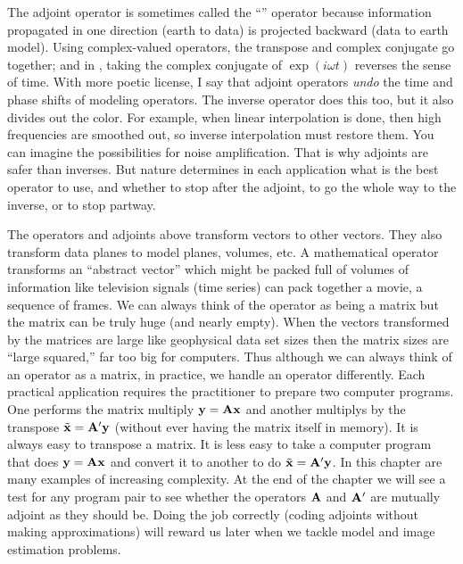 \par
The adjoint operator is sometimes called
the ``'' operator
because information propagated in one direction (earth to data) is projected
backward (data to earth model).
Using complex-valued operators,
the transpose and complex conjugate go together;
and in , taking the complex conjugate
of $\exp(i\omega t)$ reverses the sense of time.
With more poetic license, I say that adjoint operators
{\em  undo}
the time and phase shifts of modeling operators.
The inverse operator does this too,
but it also divides out the color.
For example, when linear interpolation is done,
then high frequencies are smoothed out,
so inverse interpolation must restore them.
You can imagine the possibilities for noise amplification.
That is why adjoints are safer than inverses.
But nature determines in each application what is the best operator to use,
and whether to stop after the adjoint,
to go the whole way to the inverse,
or to stop partway.

\par 
The operators and adjoints above transform vectors to other vectors.
They also transform data planes to model planes, volumes, etc.
A mathematical operator transforms an ``abstract vector'' which
might be packed full of volumes of information like television
signals (time series) can pack together a movie, a sequence of frames.
We can always think of the operator as being a matrix
but the matrix can be truly huge (and nearly empty).
When the vectors transformed by the matrices are large like
geophysical data set sizes
then the matrix sizes are ``large squared,''
far too big for computers.
Thus although we can always think of an operator as a matrix,
in practice, we handle an operator differently.
Each practical application requires the practitioner to
prepare two computer programs.
One performs the matrix multiply
$\bold y =\bold A \bold x$
and another multiplys by the transpose
$\tilde{\bold x} =\bold A' \bold y$
(without ever having the matrix itself in memory).
It is always easy to transpose a matrix.
It is less easy to take a computer program that does
$\bold y =\bold A \bold x$
and convert it to another to do
$\tilde{\bold x} =\bold A' \bold y$.
In this chapter are many examples of increasing complexity.
At the end of the chapter we will see a test for any program pair
to see whether the operators $\bold A$ and $\bold A'$ are mutually adjoint
as they should be.
Doing the job correctly (coding adjoints without making approximations)
will reward us later when we tackle model and image estimation problems.

